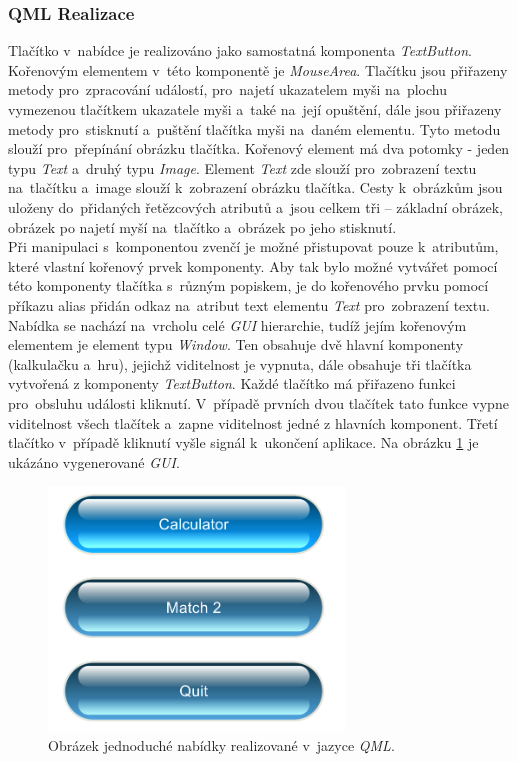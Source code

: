 \documentclass[11pt,twoside,a4paper]{book}
\begin{document}
\subsubsection{QML Realizace}
Tlačítko v~nabídce je realizováno jako samostatná komponenta \textit{TextButton}.  Kořenovým elementem v~této komponentě je \textit{MouseArea}. Tlačítku jsou přiřazeny metody pro~zpracování událostí, pro~najetí ukazatelem myši na~plochu vymezenou tlačítkem ukazatele myši a~také na~její opuštění, dále jsou přiřazeny metody pro~stisknutí a~puštění tlačítka myši na~daném elementu. Tyto metodu slouží pro~přepínání obrázku tlačítka. Kořenový element má dva potomky - jeden typu \textit{Text} a~druhý typu \textit{Image}. Element \textit{Text} zde slouží pro~zobrazení textu na~tlačítku a~image slouží k~zobrazení obrázku tlačítka. Cesty k~obrázkům jsou uloženy do~přidaných řetězcových atributů a~jsou celkem tři – základní obrázek, obrázek po najetí myší na~tlačítko a~obrázek po jeho stisknutí. \\
Při manipulaci s~komponentou zvenčí je možné přistupovat pouze k~atributům, které vlastní kořenový prvek komponenty. Aby tak bylo možné vytvářet pomocí této komponenty tlačítka s~různým popiskem, je do kořenového prvku pomocí příkazu alias přidán odkaz na~atribut text elementu \textit{Text} pro~zobrazení textu.
Nabídka se nachází na~vrcholu celé \textit{GUI} hierarchie, tudíž jejím kořenovým elementem je element typu \textit{Window}. Ten obsahuje dvě hlavní komponenty (kalkulačku a~hru), jejichž viditelnost je vypnuta, dále obsahuje tři tlačítka vytvořená z komponenty \textit{TextButton}. Každé tlačítko má přiřazeno funkci pro~obsluhu události kliknutí. V~případě prvních dvou tlačítek tato funkce vypne viditelnost všech tlačítek a~zapne viditelnost jedné z hlavních komponent. Třetí tlačítko v~případě kliknutí vyšle signál k~ukončení aplikace. Na obrázku \ref{fig:outMenuQML} je ukázáno vygenerované \textit{GUI}.
\begin{figure}[!ht]
\begin{center}
  \includegraphics[width=0.7\textwidth]{figures/qmlMenu}
\caption{{\label{fig:outMenuQML}}Obrázek jednoduché nabídky realizované v~jazyce \textit{QML}.}
\end{center}
\end{figure}
\end{document}
